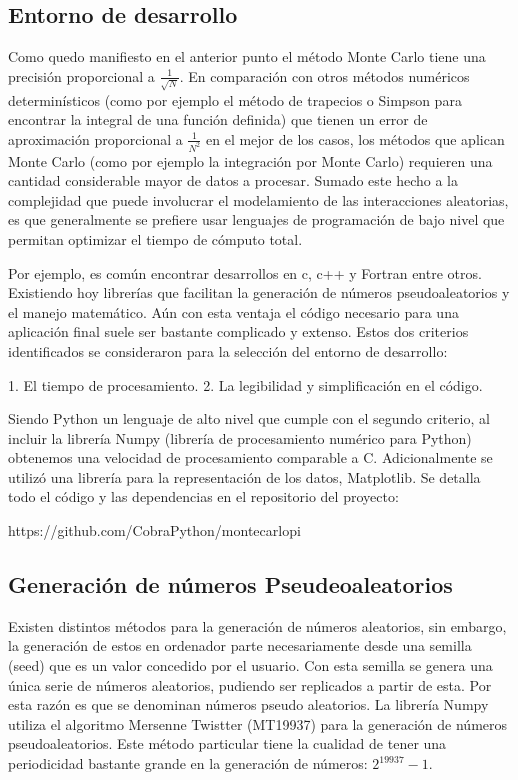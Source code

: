 \documentclass{rbf}
\begin{document}
\subsection{Entorno de desarrollo}

Como quedo manifiesto en el anterior punto el método Monte Carlo tiene una precisión proporcional a $\frac{1}{\sqrt{N}}$. En comparación con otros métodos numéricos determinísticos (como por ejemplo el método de trapecios o Simpson para encontrar la integral de una función definida) que tienen un error de aproximación proporcional a $\frac{1}{N^2}$ en el mejor de los casos, los métodos que aplican Monte Carlo (como por ejemplo la integración por Monte Carlo) requieren una cantidad considerable mayor de datos a procesar. Sumado este hecho a la complejidad que puede involucrar el modelamiento de las interacciones aleatorias, es que generalmente se prefiere usar lenguajes de programación de bajo nivel que permitan optimizar el tiempo de cómputo total.

Por ejemplo, es común encontrar desarrollos en c, c++ y Fortran entre otros. Existiendo hoy librerías que facilitan la generación de números pseudoaleatorios y el manejo matemático. Aún con esta ventaja el código necesario para una aplicación final suele ser bastante complicado y extenso.
Estos dos criterios identificados se consideraron para la selección del entorno de desarrollo:

1. El tiempo de procesamiento.
2. La legibilidad y simplificación en el código.

Siendo Python un lenguaje de alto nivel que cumple con el segundo criterio, al incluir la librería Numpy (librería de procesamiento numérico para Python) obtenemos una velocidad de procesamiento comparable a C. Adicionalmente se utilizó una librería para la representación de los datos, Matplotlib.
Se detalla todo el código y las dependencias en el repositorio del proyecto:

https://github.com/CobraPython/montecarlopi

\subsection{Generación de números Pseudeoaleatorios}

Existen distintos métodos para la generación de números aleatorios, sin embargo, la generación de estos en ordenador parte necesariamente desde una semilla (seed) que es un valor concedido por el usuario. Con esta semilla se genera una única serie de números aleatorios, pudiendo ser replicados a partir de esta. Por esta razón es que se denominan números pseudo aleatorios.
La librería Numpy utiliza el algoritmo Mersenne Twistter (MT19937) \cite{Tanguy} para la generación de números pseudoaleatorios. Este método particular tiene la cualidad de tener una periodicidad bastante grande en la generación de números: $2^{19937}−1$\cite{Makoto}.
\end{document}
